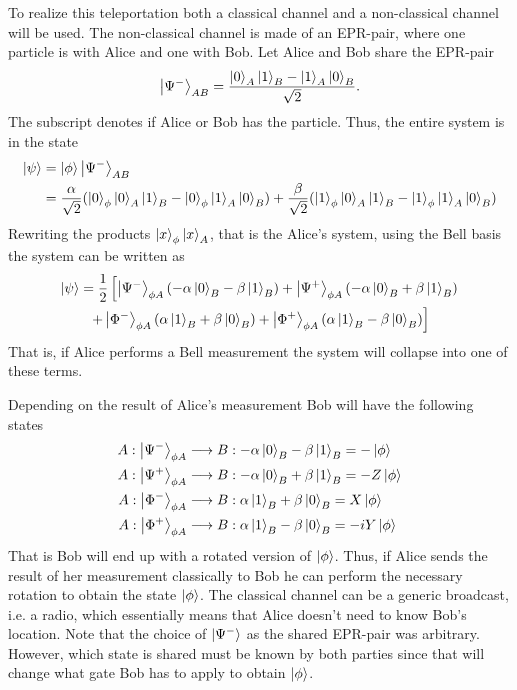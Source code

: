 To realize this teleportation both a classical channel and a non-classical channel will be used. The non-classical channel is made of an EPR-pair, where one particle is with Alice and one with Bob. Let Alice and Bob share the EPR-pair 
\begin{equation}
    \ket{\Psi^-}_{AB} = \frac{\ket{0}_A\ket{1}_B - \ket{1}_A\ket{0}_B}{\sqrt{2}}.
\end{equation}
The subscript denotes if Alice or Bob has the particle. Thus, the entire system is in the state 
\begin{align}
    \ket{\psi} &=\ket{\phi}\ket{\Psi^-}_{AB} \\ &= \frac{\alpha}{\sqrt{2}} (\ket{0}_\phi \ket{0}_A \ket{1}_B - \ket{0}_\phi \ket{1}_A \ket{0}_B) + \frac{\beta}{\sqrt{2}} (\ket{1}_\phi \ket{0}_A \ket{1}_B - \ket{1}_\phi \ket{1}_A \ket{0}_B)
\end{align}
Rewriting the products $\ket{x}_\phi\ket{x}_A$, that is the Alice's system, using the Bell basis the system can be written as 
\begin{multline}
    \ket{\psi} = \frac{1}{2}\left[
        \ket{\Psi^-}_{\phi A} (-\alpha\ket{0}_B - \beta\ket{1}_B)   
        +\ket{\Psi^+}_{\phi A} (-\alpha\ket{0}_B + \beta\ket{1}_B)\right.\\
        \left.+\ket{\Phi^-}_{\phi A} (\alpha\ket{1}_B + \beta\ket{0}_B)
        +\ket{\Phi^+}_{\phi A} (\alpha\ket{1}_B - \beta\ket{0}_B)
        \right]  
\end{multline}
That is, if Alice performs a Bell measurement the system will collapse into one of these terms. \cite{Bennett:1993}

Depending on the result of Alice's measurement Bob will have the following states
\begin{align}
    A: \ket{\Psi^-}_{\phi A} &\longrightarrow B: -\alpha\ket{0}_B - \beta \ket{1}_B = -\ket{\phi}\\
    A: \ket{\Psi^+}_{\phi A} &\longrightarrow B: -\alpha\ket{0}_B + \beta \ket{1}_B = -Z\ket{\phi}\\
    A: \ket{\Phi^-}_{\phi A} &\longrightarrow B: \alpha\ket{1}_B + \beta \ket{0}_B = X\ket{\phi}\\
    A: \ket{\Phi^+}_{\phi A} &\longrightarrow B: \alpha\ket{1}_B - \beta \ket{0}_B = -iY\ket{\phi}\\
\end{align}
That is Bob will end up with a rotated version of $\ket{\phi}$. Thus, if Alice sends the result of her measurement classically to Bob he can perform the necessary rotation to obtain the state $\ket{\phi}$. The classical channel can be a generic broadcast, i.e. a radio, which essentially means that Alice doesn't need to know Bob's location. Note that the choice of $\ket{\Psi^-}$ as the shared EPR-pair was arbitrary. However, which state is shared must be known by both parties since that will change what gate Bob has to apply to obtain $\ket{\phi}$. \cite{Bennett:1993}

